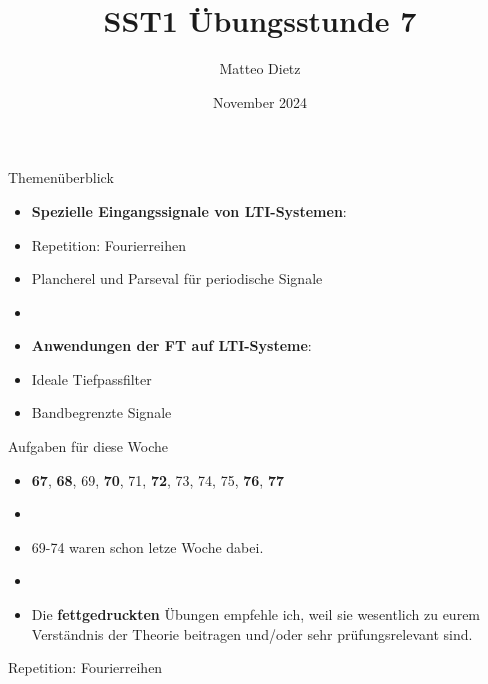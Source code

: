 \documentclass[14pt, aspectratio=169, handout]{beamer}
\title{SST1 Übungsstunde 7}
\author{Matteo Dietz}
\date{November 2024}
\begin{document}
\maketitle

\begin{frame}{Themenüberblick}
    \begin{itemize}
        \item \textbf{Spezielle Eingangssignale von LTI-Systemen}:
        \item[] Repetition: Fourierreihen
        \item[] Plancherel und Parseval für periodische Signale
        \item[] 
        \item \textbf{Anwendungen der FT auf LTI-Systeme}:
        \item[] Ideale Tiefpassfilter
        \item[] Bandbegrenzte Signale
    \end{itemize}
\end{frame}


\begin{frame}{Aufgaben für diese Woche}
    \begin{itemize}
        \item[] \textbf{67}, \textbf{68}, 69, \textbf{70}, 71, \textbf{72}, 73, 74, 75, \textbf{76}, \textbf{77}
        \item[] 
        \item[] 69-74 waren schon letze Woche dabei.
        \item[] 
        \item[] Die \textbf{fettgedruckten} Übungen empfehle ich, weil sie wesentlich zu eurem Verständnis der Theorie beitragen und/oder sehr prüfungsrelevant sind.
    \end{itemize}
\end{frame}

\begin{frame}{Repetition: Fourierreihen}
\end{frame}
\end{document}
